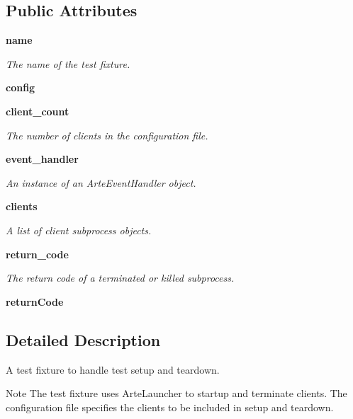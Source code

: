 \subsection*{Public Attributes}
\begin{DoxyCompactItemize}
\item 
{\bf name}
\begin{DoxyCompactList}\small\item\em The name of the test fixture. \end{DoxyCompactList}\item 
{\bfseries config}\label{classarte__test_1_1_arte_test_fixture_a7e447fee46d5124e5d7ba9797ecc4120}

\item 
{\bf client\+\_\+count}
\begin{DoxyCompactList}\small\item\em The number of clients in the configuration file. \end{DoxyCompactList}\item 
{\bf event\+\_\+handler}
\begin{DoxyCompactList}\small\item\em An instance of an Arte\+Event\+Handler object. \end{DoxyCompactList}\item 
{\bf clients}
\begin{DoxyCompactList}\small\item\em A list of client subprocess objects. \end{DoxyCompactList}\item 
{\bf return\+\_\+code}\label{classarte__test_1_1_arte_test_fixture_a0d9a1e9ef871ed25068a91f2d693e6be}

\begin{DoxyCompactList}\small\item\em The return code of a terminated or killed subprocess. \end{DoxyCompactList}\item 
{\bfseries return\+Code}\label{classarte__test_1_1_arte_test_fixture_a27442f942d329a4d3b8ef348fabb79b6}

\end{DoxyCompactItemize}


\subsection{Detailed Description}
A test fixture to handle test setup and teardown. 

\begin{DoxyNote}{Note}
The test fixture uses Arte\+Launcher to startup and terminate clients. The configuration file specifies the clients to be included in setup and teardown.
\end{DoxyNote}

